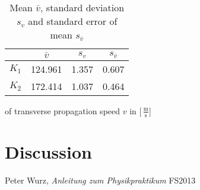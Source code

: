 \documentclass[abstract=on]{scrreprt}
\newcommand{\unit}[1]{\ensuremath{\, \mathrm{#1}}}
\begin{document}
\begin{table}[H]
\center
\begin{tabular}{|c|ccc|}
\cline{2-4}
\multicolumn{1}{c|}{}& $\bar{v}$ & $s_{v}$ & $s_{\bar{v}}$\\ \hline
$K_1$ & 124.961 & 1.357 & 0.607 \\ \hline
$K_2$ & 172.414 & 1.037 & 0.464\\ \hline
\end{tabular}
\caption{Mean $\bar{v}$, standard deviation $s_{v}$ and standard error of mean $s_{\bar{v}}$} of transverse propagation speed $v$ in [$\unit{\frac{m}{s}}$]
\end{table}

\section{Discussion}

\begin{thebibliography}{9}

  Peter Wurz,
  \emph{Anleitung zum Physikpraktikum}
  FS2013

\end{thebibliography}
\end{document}
